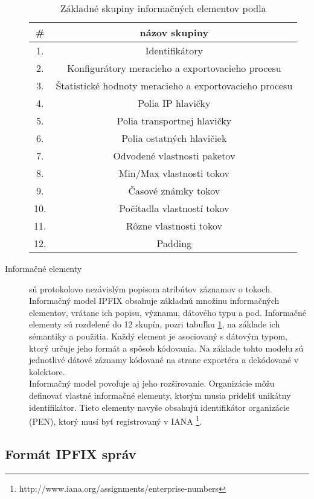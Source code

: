 \begin{description}
\tabcolsep=8pt
\begin{table}[!ht]\caption{Základné skupiny informačných elementov podla \citep{rfc5102}}\label{t:ie-table}
\smallskip
\centering
\begin{tabular}{|c|c|}
\hline
\textbf{\#} & \textbf{názov skupiny} \\ \hline
1. & Identifikátory \\ \hline
2. & Konfigurátory meracieho a exportovacieho procesu \\ \hline
3. & Štatistické hodnoty meracieho a exportovacieho procesu \\ \hline
4. & Polia IP hlavičky \\ \hline
5. & Polia transportnej hlavičky \\ \hline
6. & Polia ostatných hlavičiek \\ \hline
7. & Odvodené vlastnosti paketov \\ \hline
8. & Min/Max vlastnosti tokov \\ \hline
9. & Časové známky tokov \\ \hline
10. & Počítadla vlastností tokov \\ \hline
11. & Rôzne vlastnosti tokov \\ \hline
12. & Padding \\ \hline
\end{tabular}
\end{table}

  \item[Informačné elementy] sú protokolovo nezávislým popisom atribútov záznamov o tokoch. 
Informačný model IPFIX \citep{rfc5102} obsahuje základnú množinu informačných elementov, vrátane ich
popisu, významu, dátového typu a pod. Informačné elementy sú rozdelené do 12 skupín, pozri tabuľku \ref{t:ie-table},
na základe ich sémantiky a použitia. Každý element je asociovaný s dátovým typom, ktorý určuje jeho 
formát a spôsob kódovania.
Na základe tohto modelu sú jednotlivé dátové záznamy kódované na strane exportéra a dekódované 
v kolektore.\\
Informačný model povoľuje aj jeho rozširovanie. Organizácie môžu definovať vlastné informačné
elementy, ktorým musia prideliť unikátny identifikátor. 
Tieto elementy navyše obsahujú identifikátor organizácie (PEN), ktorý musí byť registrovaný v IANA
\footnote{http://www.iana.org/assignments/enterprise-numbers}.
\end{description}

\subsection{Formát IPFIX správ} \label{sec:message_format}

